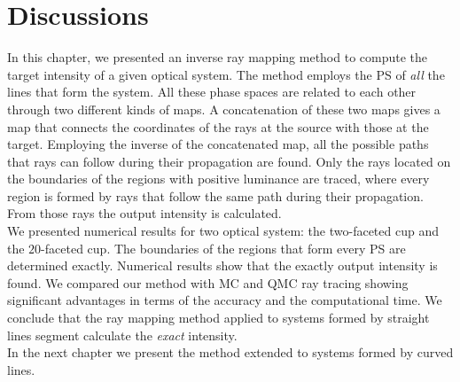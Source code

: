 \section{Discussions}
In this chapter, we presented an inverse ray mapping method to compute the target intensity of a given optical system.
The method employs the PS of \textit{all} the lines that form the system.
All these phase spaces are related to each other through two different kinds of maps.
A concatenation of these two maps gives a map that connects the coordinates of the rays at the source with those at the target.
Employing the inverse of the concatenated map, all the possible paths that rays can follow during their propagation are found. 
Only the rays located on the boundaries of the regions with positive luminance are traced,
where every region is formed by rays that follow the same path during their propagation. From those rays the output intensity is calculated. \\ \indent
We presented numerical results for two optical system: the two-faceted cup and the $20$-faceted cup. The boundaries of the regions that form every PS are determined exactly.
 Numerical results show that the exactly output intensity is found.
 We compared our method with MC and QMC ray tracing showing significant advantages in terms of the accuracy and the computational time.
 We conclude that the ray mapping method applied to systems formed by straight lines segment calculate the \textit{exact} intensity.\\
\indent In the next chapter we present the method extended to systems formed by curved lines. 


